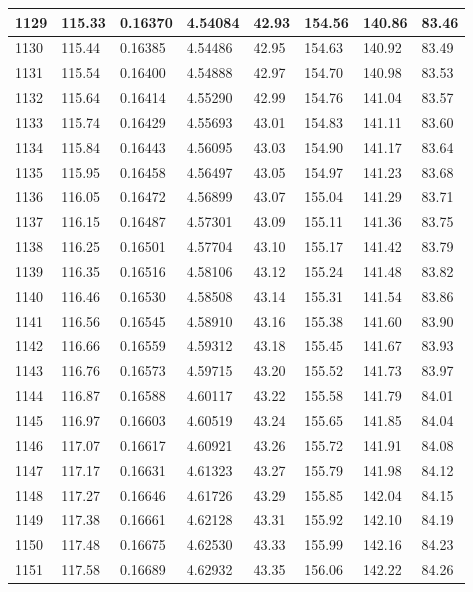 \documentclass[12pt,a4paper,twoside]{article}
\begin{document}
\begin{center}
\begin{longtable}{l l l l | l l l l}
1129 & 115.33 & 0.16370 & 4.54084 & 42.93 & 154.56 & 140.86 & 83.46 \\ \hline
1130 & 115.44 & 0.16385 & 4.54486 & 42.95 & 154.63 & 140.92 & 83.49 \\ \hline
1131 & 115.54 & 0.16400 & 4.54888 & 42.97 & 154.70 & 140.98 & 83.53 \\ \hline
1132 & 115.64 & 0.16414 & 4.55290 & 42.99 & 154.76 & 141.04 & 83.57 \\ \hline
1133 & 115.74 & 0.16429 & 4.55693 & 43.01 & 154.83 & 141.11 & 83.60 \\ \hline
1134 & 115.84 & 0.16443 & 4.56095 & 43.03 & 154.90 & 141.17 & 83.64 \\ \hline
1135 & 115.95 & 0.16458 & 4.56497 & 43.05 & 154.97 & 141.23 & 83.68 \\ \hline
1136 & 116.05 & 0.16472 & 4.56899 & 43.07 & 155.04 & 141.29 & 83.71 \\ \hline
1137 & 116.15 & 0.16487 & 4.57301 & 43.09 & 155.11 & 141.36 & 83.75 \\ \hline
1138 & 116.25 & 0.16501 & 4.57704 & 43.10 & 155.17 & 141.42 & 83.79 \\ \hline
1139 & 116.35 & 0.16516 & 4.58106 & 43.12 & 155.24 & 141.48 & 83.82 \\ \hline
1140 & 116.46 & 0.16530 & 4.58508 & 43.14 & 155.31 & 141.54 & 83.86 \\ \hline
1141 & 116.56 & 0.16545 & 4.58910 & 43.16 & 155.38 & 141.60 & 83.90 \\ \hline
1142 & 116.66 & 0.16559 & 4.59312 & 43.18 & 155.45 & 141.67 & 83.93 \\ \hline
1143 & 116.76 & 0.16573 & 4.59715 & 43.20 & 155.52 & 141.73 & 83.97 \\ \hline
1144 & 116.87 & 0.16588 & 4.60117 & 43.22 & 155.58 & 141.79 & 84.01 \\ \hline
1145 & 116.97 & 0.16603 & 4.60519 & 43.24 & 155.65 & 141.85 & 84.04 \\ \hline
1146 & 117.07 & 0.16617 & 4.60921 & 43.26 & 155.72 & 141.91 & 84.08 \\ \hline
1147 & 117.17 & 0.16631 & 4.61323 & 43.27 & 155.79 & 141.98 & 84.12 \\ \hline
1148 & 117.27 & 0.16646 & 4.61726 & 43.29 & 155.85 & 142.04 & 84.15 \\ \hline
1149 & 117.38 & 0.16661 & 4.62128 & 43.31 & 155.92 & 142.10 & 84.19 \\ \hline
1150 & 117.48 & 0.16675 & 4.62530 & 43.33 & 155.99 & 142.16 & 84.23 \\ \hline
1151 & 117.58 & 0.16689 & 4.62932 & 43.35 & 156.06 & 142.22 & 84.26 \\ \hline

\end{longtable}
\end{center}
\end{document}
